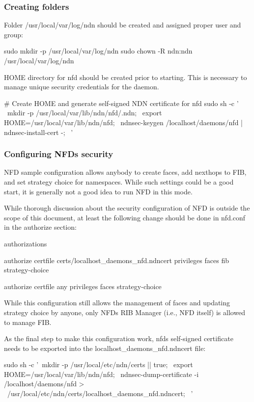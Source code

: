 \subsubsection*{Creating folders}

Folder {\ttfamily /usr/local/var/log/ndn} should be created and assigned proper user and group\+: \begin{DoxyVerb}sudo mkdir -p /usr/local/var/log/ndn
sudo chown -R ndn:ndn /usr/local/var/log/ndn
\end{DoxyVerb}


{\ttfamily H\+O\+ME} directory for {\ttfamily nfd} should be created prior to starting. This is necessary to manage unique security credentials for the daemon. \begin{DoxyVerb}# Create HOME and generate self-signed NDN certificate for nfd
sudo sh -c ' \
  mkdir -p /usr/local/var/lib/ndn/nfd/.ndn; \
  export HOME=/usr/local/var/lib/ndn/nfd; \
  ndnsec-keygen /localhost/daemons/nfd | ndnsec-install-cert -; \
'
\end{DoxyVerb}


\subsubsection*{Configuring N\+FD\textquotesingle{}s security}

N\+FD sample configuration allows anybody to create faces, add nexthops to F\+IB, and set strategy choice for namespaces. While such settings could be a good start, it is generally not a good idea to run N\+FD in this mode.

While thorough discussion about the security configuration of N\+FD is outside the scope of this document, at least the following change should be done in {\ttfamily nfd.\+conf} in the authorize section\+: \begin{DoxyVerb}authorizations
{
  authorize
  {
    certfile certs/localhost_daemons_nfd.ndncert
    privileges
    {
        faces
        fib
        strategy-choice
    }
  }

  authorize
  {
    certfile any
    privileges
    {
        faces
        strategy-choice
    }
  }
}
\end{DoxyVerb}


While this configuration still allows the management of faces and updating strategy choice by anyone, only N\+FD\textquotesingle{}s R\+IB Manager (i.\+e., N\+FD itself) is allowed to manage F\+IB.

As the final step to make this configuration work, nfd\textquotesingle{}s self-\/signed certificate needs to be exported into the {\ttfamily localhost\+\_\+daemons\+\_\+nfd.\+ndncert} file\+: \begin{DoxyVerb}sudo sh -c '\
  mkdir -p /usr/local/etc/ndn/certs || true; \
  export HOME=/usr/local/var/lib/ndn/nfd; \
  ndnsec-dump-certificate -i /localhost/daemons/nfd > \
    /usr/local/etc/ndn/certs/localhost_daemons_nfd.ndncert; \
'
\end{DoxyVerb}


